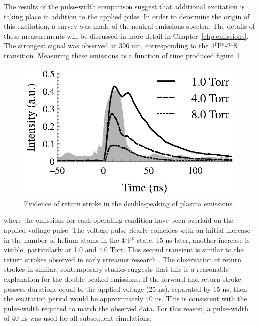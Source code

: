 The results of the pulse-width comparison suggest that additional excitation is
taking place in addition to the applied pulse. In order to determine the origin
of this excitation, a survey was made of the neutral emissions spectra. The
details of these measurements will be discussed in more detail in
Chapter~\ref{chp:emissions}. The strongest signal was observed at 396 nm,
corresponding to the 4$^1$P$^\mathrm{o}$-2$^1$S transition. Measuring these
emissions as a function of time produced figure~\ref{fig:double}
\begin{figure}
  \centering
  \includegraphics{./chapters/modeling/figures/double.eps}
  \caption{Evidence of return stroke in the double-peaking of plasma emissions.}
  \label{fig:double}
\end{figure}
where the emissions for each operating condition have been overlaid on the
applied voltage pulse. The voltage pulse clearly coincides with an initial
increase in the number of helium atoms in the 4$^1$P$^\mathrm{o}$ state. 15 ns
later, another increase is visible, particularly at 1.0 and 4.0 Torr. This
second transient is similar to the return strokes observed in early streamer
research \cite{Snoddy1936, Loeb1940, Mitchell1947}. The observation of return
strokes in similar, contemporary studies \cite{Vasilyak1994, Pai2009,
Starikovskiy2013} suggests that this is a reasonable explanation for the
double-peaked emissions. If the forward and return stroke possess durations
equal to the applied voltage (25 ns), separated by 15 ns, then the excitation
period would be approximately 40 ns. This is consistent with the pulse-width
required to match the observed data. For this reason, a pulse-width of 40 ns was
used for all subsequent simulations.

